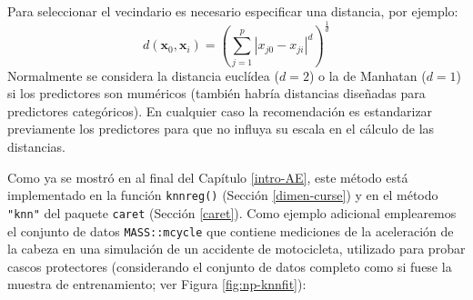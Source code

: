 \documentclass[
]{book}
\theoremstyle{break}
\theoremstyle{nonumberplain}
\begin{document}
Para seleccionar el vecindario es necesario especificar una distancia, por ejemplo:
\[d(\mathbf{x}_0, \mathbf{x}_i) = \left( \sum_{j=1}^p \left| x_{j0} - x_{ji}  \right|^d  \right)^{\frac{1}{d}}\]
Normalmente se considera la distancia euclídea (\(d=2\)) o la de Manhatan (\(d=1\)) si los predictores son muméricos (también habría distancias diseñadas para predictores categóricos).
En cualquier caso la recomendación es estandarizar previamente los predictores para que no influya su escala en el cálculo de las distancias.

Como ya se mostró en al final del Capítulo \ref{intro-AE}, este método está implementado en la función \texttt{knnreg()} (Sección \ref{dimen-curse}) y en el método \texttt{"knn"} del paquete \texttt{caret} (Sección \ref{caret}).
Como ejemplo adicional emplearemos el conjunto de datos \texttt{MASS::mcycle} que contiene mediciones de la aceleración de la cabeza en una simulación de un accidente de motocicleta, utilizado para probar cascos protectores (considerando el conjunto de datos completo como si fuese la muestra de entrenamiento; ver Figura \ref{fig:np-knnfit}):
\end{document}
